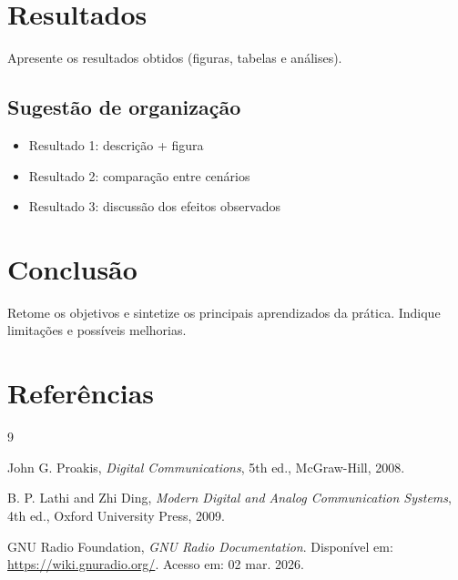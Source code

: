 \documentclass[12pt,a4paper]{article}
\begin{document}
\section{Resultados}
Apresente os resultados obtidos (figuras, tabelas e análises).

\subsection*{Sugestão de organização}
\begin{itemize}
    \item Resultado 1: descrição + figura
    \item Resultado 2: comparação entre cenários
    \item Resultado 3: discussão dos efeitos observados
\end{itemize}

\section{Conclusão}
Retome os objetivos e sintetize os principais aprendizados da prática. Indique limitações e possíveis melhorias.

\section{Referências}
\begin{thebibliography}{9}

John G. Proakis,
\textit{Digital Communications},
5th ed., McGraw-Hill, 2008.

B. P. Lathi and Zhi Ding,
\textit{Modern Digital and Analog Communication Systems},
4th ed., Oxford University Press, 2009.

GNU Radio Foundation,
\textit{GNU Radio Documentation}.
Disponível em: \url{https://wiki.gnuradio.org/}.
Acesso em: 02 mar. 2026.

\end{thebibliography}
\end{document}
